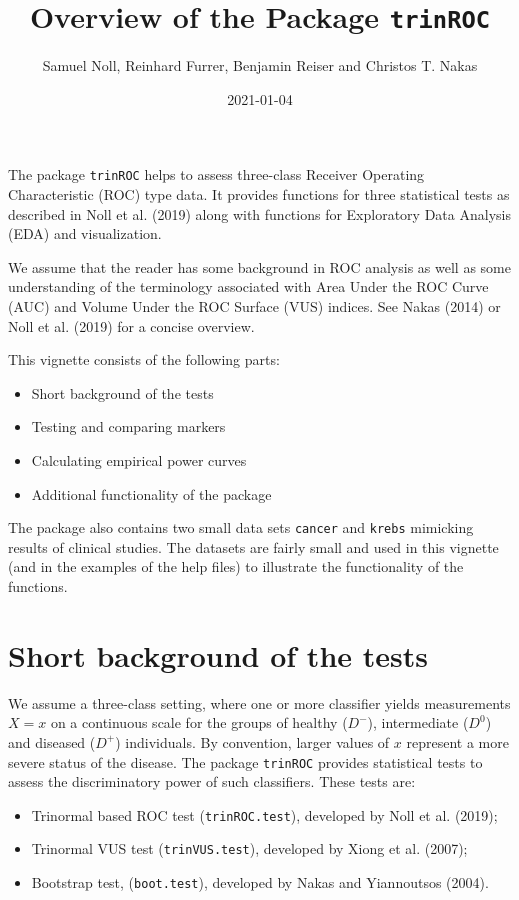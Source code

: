 \documentclass[
]{article}
\title{Overview of the Package \texttt{trinROC}}
\author{Samuel Noll, Reinhard Furrer, Benjamin Reiser and Christos T.
Nakas}
\date{2021-01-04}
\providecommand{\tightlist}{%
  \setlength{\itemsep}{0pt}\setlength{\parskip}{0pt}}
\begin{document}
\maketitle

The package \texttt{trinROC} helps to assess three-class Receiver
Operating Characteristic (ROC) type data. It provides functions for
three statistical tests as described in Noll et al. (2019) along with
functions for Exploratory Data Analysis (EDA) and visualization.

We assume that the reader has some background in ROC analysis as well as
some understanding of the terminology associated with Area Under the ROC
Curve (AUC) and Volume Under the ROC Surface (VUS) indices. See Nakas
(2014) or Noll et al. (2019) for a concise overview.

This vignette consists of the following parts:

\begin{itemize}
\tightlist
\item
  Short background of the tests
\item
  Testing and comparing markers
\item
  Calculating empirical power curves
\item
  Additional functionality of the package
\end{itemize}

The package also contains two small data sets \texttt{cancer} and
\texttt{krebs} mimicking results of clinical studies. The datasets are
fairly small and used in this vignette (and in the examples of the help
files) to illustrate the functionality of the functions.

\hypertarget{short-background-of-the-tests}{%
\section{Short background of the
tests}\label{short-background-of-the-tests}}

We assume a three-class setting, where one or more classifier yields
measurements \(X = x\) on a continuous scale for the groups of healthy
(\(D^-\)), intermediate (\(D^0\)) and diseased (\(D^+\)) individuals. By
convention, larger values of \(x\) represent a more severe status of the
disease. The package \texttt{trinROC} provides statistical tests to
assess the discriminatory power of such classifiers. These tests are:

\begin{itemize}
\tightlist
\item
  Trinormal based ROC test (\texttt{trinROC.test}), developed by Noll et
  al. (2019);
\item
  Trinormal VUS test (\texttt{trinVUS.test}), developed by Xiong et al.
  (2007);
\item
  Bootstrap test, (\texttt{boot.test}), developed by Nakas and
  Yiannoutsos (2004).
\end{itemize}
\end{document}
